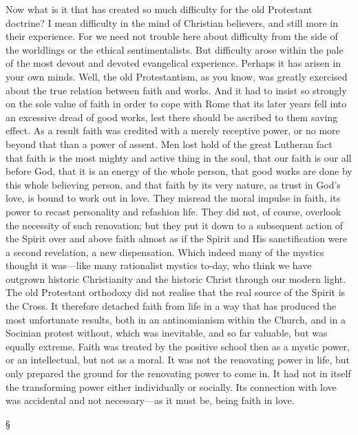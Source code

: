 \documentclass[12pt,letterpaper,oneside]{book}
\begin{document}
Now what is it that has created so much difficulty 
for the old Protestant doctrine? I mean 
difficulty in the mind of Christian believers, and 
still more in their experience. For we need not 
trouble here about difficulty from the side of the 
worldlings or the ethical sentimentalists. But 
difficulty arose within the pale of the most 
devout and devoted evangelical experience. 
Perhaps it has arisen in your own minds. Well, 
the old Protestantism, as you know, was greatly 
exercised about the true relation between faith 
and works. And it had to insist so strongly on 
the sole value of faith in order to cope with 
Rome that its later years fell into an excessive 
dread of good works, lest there should be 
ascribed to them saving effect. As a result faith 
was credited with a merely receptive power, or 
no more beyond that than a power of assent. 
Men lost hold of the great Lutheran fact that 
faith is the most mighty and active thing in the 
soul, that our faith is our all before God, that it 
is an energy of the whole person, that good 
works are done by this whole believing person, 
and that faith by its very nature, as trust in God's 
love, is bound to work out in love. They misread 
the moral impulse in faith, its power to 
recast personality and refashion life. They did 
not, of course, overlook the necessity of such 
renovation; but they put it down to a subsequent 
action of the Spirit over and above faith 
almost as if the Spirit and His sanctification were 
a second revelation, a new dispensation. Which 
indeed many of the mystics thought it was---like 
many rationalist mystics to-day, who think we 
have outgrown historic Christianity and the 
historic Christ through our modern light. The 
old Protestant orthodoxy did not realise that the 
real source of the Spirit is the Cross. It therefore 
detached faith from life in a way that has produced 
the most unfortunate results, both in an 
antinomianism within the Church, and in a 
Socinian protest without, which was inevitable, 
and so far valuable, but was equally extreme. 
Faith was treated by the positive school then as a 
mystic power, or an intellectual, but not as a 
moral. It was not the renovating power in life, 
but only prepared the ground for the renovating 
power to come in. It had not in itself the transforming 
power either individually or socially. 
Its connection with love was accidental and not 
necessary---as it must be, being faith in love. 

\begin{center}
\S
\end{center}
\end{document}
